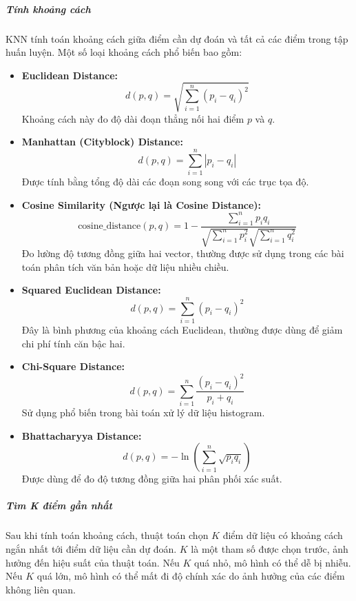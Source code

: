 \documentclass[a4paper,12pt]{article}
\begin{document}
\subparagraph{Tính khoảng cách}  
\hspace{5mm}KNN tính toán khoảng cách giữa điểm cần dự đoán và tất cả các điểm trong tập huấn luyện. Một số loại khoảng cách phổ biến bao gồm:
\begin{itemize}
    \item \textbf{Euclidean Distance:}
    \[
    d(p, q) = \sqrt{\sum_{i=1}^{n} (p_i - q_i)^2}
    \]
    Khoảng cách này đo độ dài đoạn thẳng nối hai điểm \(p\) và \(q\).
    
    \item \textbf{Manhattan (Cityblock) Distance:}
    \[
    d(p, q) = \sum_{i=1}^{n} |p_i - q_i|
    \]
    Được tính bằng tổng độ dài các đoạn song song với các trục tọa độ.

    \item \textbf{Cosine Similarity (Ngược lại là Cosine Distance):}
    \[
    \text{cosine\_distance}(p, q) = 1 - \frac{\sum_{i=1}^n p_i q_i}{\sqrt{\sum_{i=1}^n p_i^2} \sqrt{\sum_{i=1}^n q_i^2}}
    \]
    Đo lường độ tương đồng giữa hai vector, thường được sử dụng trong các bài toán phân tích văn bản hoặc dữ liệu nhiều chiều.

    \item \textbf{Squared Euclidean Distance:}
    \[
    d(p, q) = \sum_{i=1}^{n} (p_i - q_i)^2
    \]
    Đây là bình phương của khoảng cách Euclidean, thường được dùng để giảm chi phí tính căn bậc hai.

    \item \textbf{Chi-Square Distance:}
    \[
    d(p, q) = \sum_{i=1}^{n} \frac{(p_i - q_i)^2}{p_i + q_i}
    \]
    Sử dụng phổ biến trong bài toán xử lý dữ liệu histogram.

    \item \textbf{Bhattacharyya Distance:}
    \[
    d(p, q) = -\ln \left(\sum_{i=1}^{n} \sqrt{p_i q_i}\right)
    \]
    Được dùng để đo độ tương đồng giữa hai phân phối xác suất.
\end{itemize}
\newpage
\subparagraph{Tìm K điểm gần nhất}  
\hspace{5mm}Sau khi tính toán khoảng cách, thuật toán chọn \(K\) điểm dữ liệu có khoảng cách ngắn nhất tới điểm dữ liệu cần dự đoán. \(K\) là một tham số được chọn trước, ảnh hưởng đến hiệu suất của thuật toán. Nếu \(K\) quá nhỏ, mô hình có thể dễ bị nhiễu. Nếu \(K\) quá lớn, mô hình có thể mất đi độ chính xác do ảnh hưởng của các điểm không liên quan.
\end{document}
